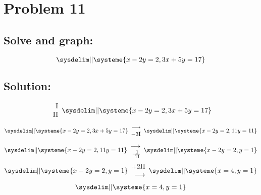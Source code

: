 \documentclass{article}
\begin{document}
\pagebreak

\section*{Problem 11}
\subsection*{Solve and graph:}
\begin{equation*}
    \sysdelim||\systeme{
        x - 2y = 2,
        3x + 5y = 17
    }
\end{equation*}
\subsection*{Solution:}
\begin{equation*}
    \begin{array}{rr}
        $I$\\$II$
    \end{array}
    \sysdelim||\systeme{
        x - 2y = 2,
        3x + 5y = 17
    }
\end{equation*}
\begin{equation*}
    \sysdelim||\systeme{
        x - 2y = 2,
        3x + 5y = 17
    }
    \begin{array}{rr}
        \longrightarrow
        \\
        -3$I$
    \end{array}
    \sysdelim||\systeme{
        x - 2y = 2,
        11y = 11
    }
\end{equation*}
\begin{equation*}
    \sysdelim||\systeme{
        x - 2y = 2,
        11y = 11
    }
    \begin{array}{rr}
        \longrightarrow
        \\
        \cdot \frac{1}{11}
    \end{array}
    \sysdelim||\systeme{
        x - 2y = 2,
        y = 1
    }
\end{equation*}
\begin{equation*}
    \sysdelim||\systeme{
        x - 2y = 2,
        y = 1
    }
    \begin{array}{rr}
        +2$II$
        \\
        \longrightarrow
    \end{array}
    \sysdelim||\systeme{
        x = 4,
        y = 1
    }
\end{equation*}
\begin{equation*}
    \sysdelim||\systeme{
        x = 4,
        y = 1
    }
\end{equation*}
\end{document}
